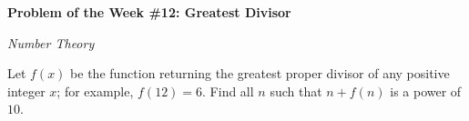 \begin{potw}\vspace{5pt}
{\large\textbf{Problem of the Week \#12: Greatest Divisor}}\vspace{5pt}

\textit{Number Theory}\V

Let $f(x)$ be the function returning the greatest proper divisor of any positive integer $x$; for example, $f(12) = 6$. Find all $n$ such that $n + f(n)$ is a power of $10$.
\end{potw}\V
